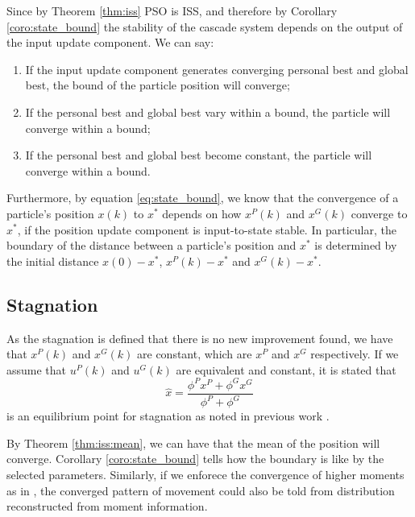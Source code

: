 \documentclass{sig-alternate}
\begin{document}
Since by Theorem \ref{thm:iss} PSO is ISS, and therefore by Corollary \ref{coro:state_bound} the stability of the cascade system depends on the output of the input update component. 
We can say:
\begin{enumerate}
\item If the input update component generates converging personal best and global best, the bound of the particle position will converge;
\item If the personal best and global best vary within a bound, the particle will converge within a bound;
\item If the personal best and global best become constant, the particle will converge within a bound.
\end{enumerate}

Furthermore, by equation \eqref{eq:state_bound}, we know that the convergence of a particle's position $ x(k) $ to $ x^{*} $ depends on how $ x^{P}(k) $ and $ x^{G}(k) $ converge to $ x^{*} $, if the position update component is input-to-state stable.
In particular, the boundary of the distance between a particle's position and  $ x^{*} $ is determined by the initial distance $ x(0) -  x^{*} $, $ x^{P}(k) -  x^{*} $ and $ x^{G}(k) -  x^{*} $.

\subsection{Stagnation}

As the stagnation is defined that there is no new improvement found, we have that $ x^{P}(k) $ and $ x^{G}(k) $ are constant, which are $ x^{P} $ and $ x^{G} $ respectively.
If we assume that $ u^{P}(k) $ and $ u^{G}(k) $ are equivalent and constant, it is stated that
\begin{equation}
\label{eq:single_obj_equilibrium}
\hat{x} = \frac{\phi^{P} x^{P} + \phi^{G} x^{G} }{ \phi^{P} + \phi^{G} } 
\end{equation}
is an equilibrium point for stagnation as noted in previous work \cite{985692}.

By Theorem \ref{thm:iss:mean}, we can have that the mean of the position will converge.
Corollary \ref{coro:state_bound} tells how the boundary is like by the selected parameters.
Similarly, if we enforece the convergence of higher moments as in \cite{Jiang20078, Poli:2007:EAS:1276958.1276977}, the converged pattern of movement could also be told from distribution reconstructed from moment information.
\end{document}
